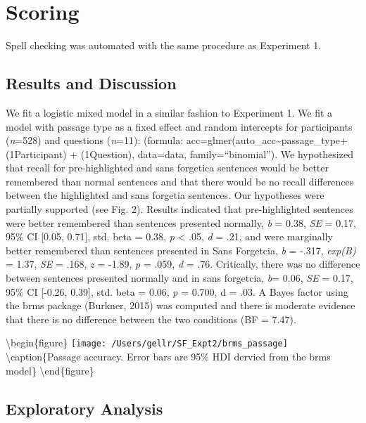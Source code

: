 \documentclass[doc]{apa6}
\begin{document}
\hypertarget{scoring-1}{%
\section{Scoring}\label{scoring-1}}

Spell checking was automated with the same procedure as Experiment 1.

\hypertarget{results-and-discussion-1}{%
\subsection{Results and Discussion}\label{results-and-discussion-1}}

We fit a logistic mixed model in a similar fashion to Experiment 1. We fit a model with passage type as a fixed effect and random intercepts for participants (\emph{n}=528) and questions (\emph{n}=11): (formula: acc=glmer(auto\_acc\textasciitilde{}passage\_type+(1\textbar{}Participant) + (1\textbar{}Question), data=data, family=\enquote{binomial}). We hypothesized that recall for pre-highlighted and sans forgetica sentences would be better remembered than normal sentences and that there would be no recall differences between the highlighted and sans forgetia sentences. Our hypotheses were partially supported (see Fig. 2). Results indicated that pre-highlighted sentences were better remembered than sentences presented normally, \emph{b} = 0.38, \emph{SE} = 0.17, 95\% CI {[}0.05, 0.71{]}, std. beta = 0.38, \emph{p} \textless{} .05, \emph{d} = .21, and were marginally better remembered than sentences presented in Sans Forgetcia, \emph{b} = -.317, \emph{exp(B)} = 1.37, \emph{SE} = .168, \emph{z} = -1.89, \emph{p} = .059, \emph{d} = .76. Critically, there was no difference between sentences presented normally and in sans forgetcia, \emph{b}= 0.06, \emph{SE} = 0.17, 95\% CI {[}-0.26, 0.39{]}, std. beta = 0.06, \emph{p} = 0.700, d = .03. A Bayes factor using the brms package (Burkner, 2015) was computed and there is moderate evidence that there is no difference between the two conditions (BF = 7.47).

\textbackslash{}begin\{figure\}
\texttt{[image: /Users/gellr/SF\_Expt2/brms\_passage]} \textbackslash{}caption\{Passage accuracy. Error bars are 95\% HDI dervied from the brms model\}\label{fig:unnamed-chunk-5}
\textbackslash{}end\{figure\}

\hypertarget{exploratory-analysis}{%
\subsection{Exploratory Analysis}\label{exploratory-analysis}}
\end{document}
